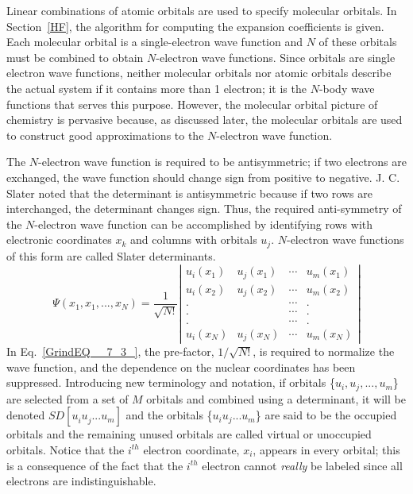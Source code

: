 \documentclass[11pt,oneside,final]{huthesis}%
\begin{document}
Linear combinations of atomic orbitals are used to specify molecular orbitals. In Section~\ref{HF}, the algorithm for computing the expansion coefficients is given.  Each molecular orbital is a single-electron wave function and $N$ of these orbitals must be combined to obtain $N$-electron wave functions. Since orbitals are single electron wave functions, neither molecular orbitals nor atomic orbitals describe the actual system if it contains more than 1 electron; it is the $N$-body wave functions that serves this purpose.  However, the molecular orbital picture of chemistry is pervasive because, as discussed later, the molecular orbitals are used to construct good approximations to the $N$-electron wave function.

The $N$-electron wave function is required to be antisymmetric; if two electrons are exchanged, the wave function should change sign from positive to negative.   J. C. Slater  noted that the determinant is antisymmetric because if two rows are interchanged, the determinant changes sign.  Thus, the required anti-symmetry of the $N$-electron wave function can be accomplished by identifying rows with electronic coordinates $x_k$ and columns with orbitals $u_j$.  $N$-electron wave functions of this form are called Slater determinants.  %
\begin{equation} \label{GrindEQ__7_3_} 
\Psi (x_{1} ,x_{1} ,...,x_{N} )=\frac{1}{\sqrt{N!} } \left|\begin{array}{cccc} {u_{i} (x_{1} )} & {u_{j} (x_{1} )} & {\cdots } & {u_{m} (x_{1} )} \\ {u_{i} (x_{2} )} & {u_{j} (x_{2} )} & {\cdots } & {u_{m} (x_{2} )} \\ {.} & {} & {\cdots } & {.} \\ {.} & {} & {\cdots } & {.} \\ {.} & {} & {\cdots } & {.} \\ {u_{i} (x_{N} )} & {u_{j} (x_{N} )} & {\cdots } & {u_{m} (x_{N} )} \end{array}\right| 
\end{equation} 
In Eq.~\eqref{GrindEQ__7_3_}, the pre-factor, $1/\sqrt{N!}$, is required to normalize the wave function, and the dependence on the nuclear coordinates has been suppressed.  Introducing new terminology and notation, if orbitals \{$u_{i}, u_{j}, ..., u_{m} $\} are selected from a set of $M$ orbitals and combined using a determinant, it will be denoted $SD[u_{i}^{} u_{j}^{} ...u_{m}^{} ]$ and the orbitals \{$u_{i} u_{j} ...u_{m} $\} are said to be the {occupied orbitals} and the remaining unused orbitals are called {virtual} or {unoccupied orbitals}.  Notice that the ${i}^{th}$ electron coordinate, ${x}_{i}$, appears in every orbital; this is a consequence of the fact that the ${i}^{th}$ electron cannot \emph{really} be labeled since all electrons are indistinguishable.
\end{document}
